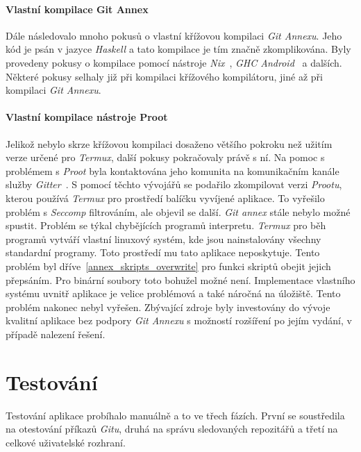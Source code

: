     \subsubsection{Vlastní kompilace Git Annex}
    Dále následovalo mnoho pokusů o vlastní křížovou kompilaci \emph{Git Annexu}. Jeho kód je psán v jazyce \emph{Haskell} a tato kompilace je tím značně zkomplikována. Byly provedeny pokusy o kompilace pomocí nástroje \emph{Nix}~, \emph{GHC Android}~ a dalších. Některé pokusy selhaly již při kompilaci křížového kompilátoru, jiné až při kompilaci \emph{Git Annexu}.

    \subsubsection{Vlastní kompilace nástroje Proot}
    Jelikož nebylo skrze křížovou kompilaci dosaženo většího pokroku než užitím verze určené pro \emph{Termux}, další pokusy pokračovaly právě s ní. Na pomoc s problémem s \emph{Proot} byla kontaktována jeho komunita na komunikačním kanále služby \emph{Gitter}~. S pomocí těchto vývojářů se podařilo zkompilovat verzi \emph{Prootu}, kterou používá \emph{Termux} pro prostředí balíčku vyvíjené aplikace. To vyřešilo problém s \emph{Seccomp} filtrováním, ale objevil se další. \emph{Git annex} stále nebylo možné spustit. Problém se týkal chybějících programů interpretu. \emph{Termux} pro běh programů vytváří vlastní linuxový systém, kde jsou nainstalovány všechny standardní programy. Toto prostředí mu tato aplikace neposkytuje. Tento problém byl dříve~\ref{annex_skripts_overwrite} pro funkci skriptů obejit jejich přepsáním. Pro binární soubory toto bohužel možné není. Implementace vlastního systému uvnitř aplikace je velice problémová a také náročná na úložiště. Tento problém nakonec nebyl vyřešen. Zbývající zdroje byly investovány do vývoje kvalitní aplikace bez podpory \emph{Git Annexu} s možností rozšíření po jejím vydání, v případě nalezení řešení.

\chapter{Testování}
Testování aplikace probíhalo manuálně a to ve třech fázích. První se soustředila na otestování příkazů \emph{Gitu}, druhá na správu sledovaných repozitářů a třetí na celkové uživatelské rozhraní.


